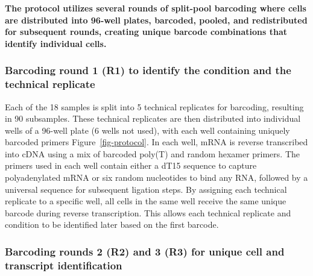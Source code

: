 \documentclass[
  11pt,
  a4paper,
]{report}
\begin{document}
\begin{tcolorbox}[enhanced jigsaw, colbacktitle=quarto-callout-tip-color!10!white, bottomtitle=1mm, coltitle=black, colframe=quarto-callout-tip-color-frame, left=2mm, bottomrule=.15mm, rightrule=.15mm, opacityback=0, toptitle=1mm, colback=white, title=\textcolor{quarto-callout-tip-color}{\faLightbulb}\hspace{0.5em}{Tip}, arc=.35mm, toprule=.15mm, breakable, leftrule=.75mm, opacitybacktitle=0.6, titlerule=0mm]

\textbf{The protocol utilizes several rounds of split-pool barcoding
where cells are distributed into 96-well plates, barcoded, pooled, and
redistributed for subsequent rounds, creating unique barcode
combinations that identify individual cells.}

\end{tcolorbox}

\subsubsection{Barcoding round 1 (R1) to identify the condition and the
technical
replicate}\label{barcoding-round-1-r1-to-identify-the-condition-and-the-technical-replicate}

Each of the 18 samples is split into 5 technical replicates for
barcoding, resulting in 90 subsamples. These technical replicates are
then distributed into individual wells of a 96-well plate (6 wells not
used), with each well containing uniquely barcoded primers
Figure~\ref{fig-protocol}. In each well, mRNA is reverse transcribed
into cDNA using a mix of barcoded poly(T) and random hexamer primers.
The primers used in each well contain either a dT15 sequence to capture
polyadenylated mRNA or six random nucleotides to bind any RNA, followed
by a universal sequence for subsequent ligation steps. By assigning each
technical replicate to a specific well, all cells in the same well
receive the same unique barcode during reverse transcription. This
allows each technical replicate and condition to be identified later
based on the first barcode.

\subsubsection{Barcoding rounds 2 (R2) and 3 (R3) for unique cell and
transcript
identification}\label{barcoding-rounds-2-r2-and-3-r3-for-unique-cell-and-transcript-identification}
\end{document}
